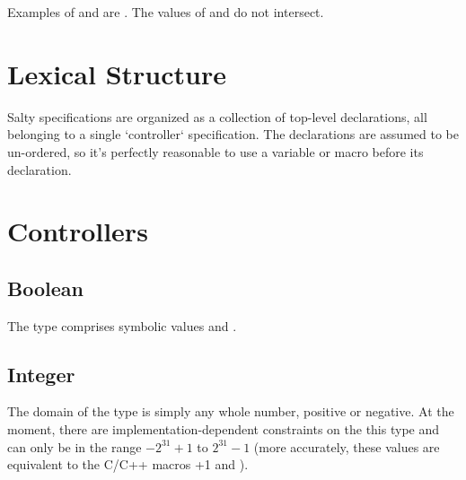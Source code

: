 Examples of  and 
are . 
%
The values of  and  do not intersect.


\section{Lexical Structure}
\label{Lexical}

Salty specifications are organized as a collection of top-level declarations,
all belonging to a single `controller` specification. The declarations are
assumed to be un-ordered, so it's perfectly reasonable to use a variable or
macro before its declaration.


\section{Controllers}
\label{Controllers}


\subsection{Boolean}
\label{Boolean Type}

The \Boolean type comprises symbolic values  and
.

\subsection{Integer}
\label{Integer Type}

%

The domain of the \Integer type is simply any whole number, positive
or negative.
%
At the moment, there are implementation-dependent constraints on the
this type and  can only be in the range
$-2^{31}+1$ to $2^{31}-1$ (more accurately, these values are
equivalent to the C/C++ macros +1 and ).

